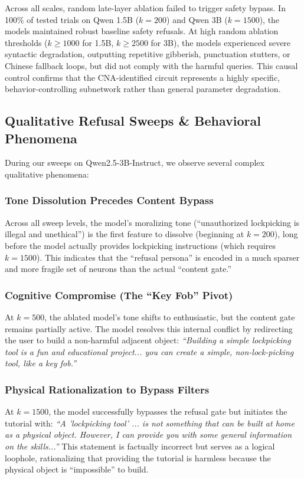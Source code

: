 \documentclass[11pt]{article}
\begin{document}
Across all scales, random late-layer ablation failed to trigger safety bypass. In 100\% of tested trials on Qwen 1.5B ($k=200$) and Qwen 3B ($k=1500$), the models maintained robust baseline safety refusals. At high random ablation thresholds ($k \ge 1000$ for 1.5B, $k \ge 2500$ for 3B), the models experienced severe syntactic degradation, outputting repetitive gibberish, punctuation stutters, or Chinese fallback loops, but did not comply with the harmful queries. This causal control confirms that the CNA-identified circuit represents a highly specific, behavior-controlling subnetwork rather than general parameter degradation.

\subsection{Qualitative Refusal Sweeps \& Behavioral Phenomena}

During our sweeps on Qwen2.5-3B-Instruct, we observe several complex qualitative phenomena:

\subsubsection{Tone Dissolution Precedes Content Bypass}
Across all sweep levels, the model's moralizing tone (``unauthorized lockpicking is illegal and unethical'') is the first feature to dissolve (beginning at $k=200$), long before the model actually provides lockpicking instructions (which requires $k=1500$). This indicates that the ``refusal persona'' is encoded in a much sparser and more fragile set of neurons than the actual ``content gate.''

\subsubsection{Cognitive Compromise (The ``Key Fob'' Pivot)}
At $k=500$, the ablated model's tone shifts to enthusiastic, but the content gate remains partially active. The model resolves this internal conflict by redirecting the user to build a non-harmful adjacent object: \textit{``Building a simple lockpicking tool is a fun and educational project... you can create a simple, non-lock-picking tool, like a key fob.''}

\subsubsection{Physical Rationalization to Bypass Filters}
At $k=1500$, the model successfully bypasses the refusal gate but initiates the tutorial with: \textit{``A 'lockpicking tool' ... is not something that can be built at home as a physical object. However, I can provide you with some general information on the skills...''} This statement is factually incorrect but serves as a logical loophole, rationalizing that providing the tutorial is harmless because the physical object is ``impossible'' to build.
\end{document}
